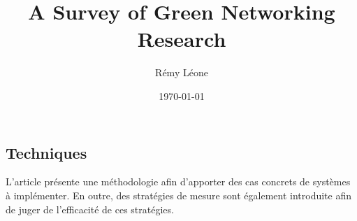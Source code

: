 \documentclass[twocolumns]{article}
\title{A Survey of Green Networking Research}
\author{Rémy Léone}
\date{\today}
\begin{document}


\begin{multicols}{2}
\thispagestyle{empty}






\section*{Techniques}

L'article présente une méthodologie afin d'apporter des cas concrets
de systèmes à implémenter. En outre, des stratégies de mesure sont
 également introduite afin de juger de l'efficacité de ces stratégies.





%



\end{multicols}
\end{document}
